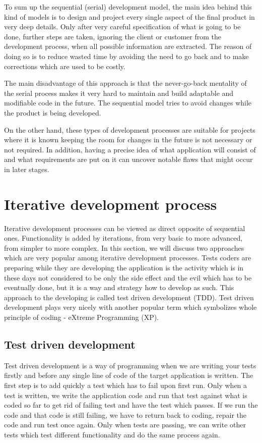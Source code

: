 \documentclass[12pt,final,oneside]{fithesis}
\begin{document}
To sum up the sequential (serial) development model, the main idea behind this kind of models is to design and project every single aspect of the final product in very deep details. Only after very careful specification of what is going to be done, further steps are taken, ignoring the client or customer from the development process, when all possible information are extracted. The reason of doing so is to reduce wasted time by avoiding the need to go back and to make corrections which are used to be costly.

The main disadvantage of this approach is that the never-go-back mentality of the serial process makes it very hard to maintain and build adaptable and modifiable code in the future. The sequential model tries to avoid changes while the product is being developed.

On the other hand, these types of development processes are suitable for projects where it is known keeping the room for changes in the future is not necessary or not required. In addition, having a precise idea of what application will consist of and what requirements are put on it can uncover notable flaws that might occur in later stages.

	\section{Iterative development process}

Iterative development processes can be viewed as direct opposite of sequential ones. Functionality is added by iterations, from very basic to more advanced, from simpler to more complex. In this section, we will discuss two approaches which are very popular among iterative development processes. Tests coders are preparing while they are developing the application is the activity which is in these days not considered to be only the side effect and the evil which has to be eventually done, but it is a way and strategy how to develop as such. This approach to the developing is called test driven development (TDD). Test driven development plays very nicely with another popular term which symbolizes whole principle of coding - eXtreme Programming (XP).

	\subsection{Test driven development}
	
Test driven development is a way of programming when we are writing your tests firstly and before any single line of code of the target application is written. The first step is to add quickly a test which has to fail upon first run. Only when a test is written, we write the application code and run that test against what is coded so far to get rid of failing test and have the test which passes. If we run the code and that code is still failing, we have to return back to coding, repair the code and run test once again. Only when tests are passing, we can write other tests which test different functionality and do the same process again.
\end{document}
